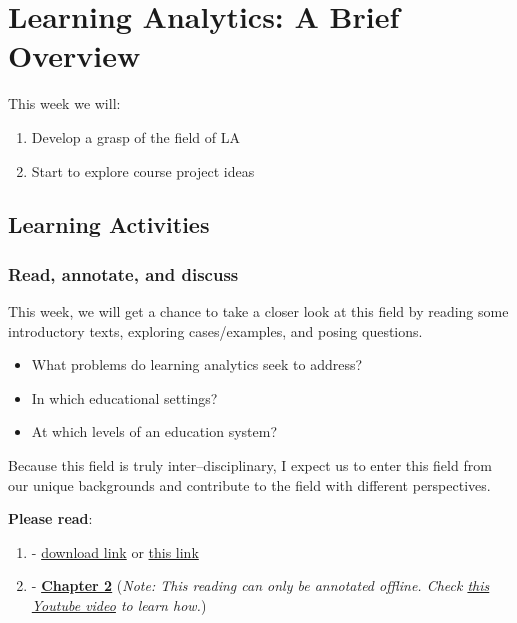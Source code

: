 \documentclass[
]{book}
\providecommand{\tightlist}{%
  \setlength{\itemsep}{0pt}\setlength{\parskip}{0pt}}
\begin{document}
\hypertarget{learning-analytics-a-brief-overview}{%
\chapter{Learning Analytics: A Brief Overview}\label{learning-analytics-a-brief-overview}}

This week we will:

\begin{enumerate}
\def\labelenumi{\arabic{enumi}.}
\tightlist
\item
  Develop a grasp of the field of LA
\item
  Start to explore course project ideas
\end{enumerate}

\hypertarget{learning-activities}{%
\section{Learning Activities}\label{learning-activities}}

\hypertarget{read-annotate-and-discuss}{%
\subsection{Read, annotate, and discuss}\label{read-annotate-and-discuss}}

This week, we will get a chance to take a closer look at this field by reading some introductory texts, exploring cases/examples, and posing questions.

\begin{itemize}
\tightlist
\item
  What problems do learning analytics seek to address?
\item
  In which educational settings?
\item
  At which levels of an education system?
\end{itemize}

Because this field is truly inter--disciplinary, I expect us to enter this field from our unique backgrounds and contribute to the field with different perspectives.

\textbf{Please read}:

\begin{enumerate}
\def\labelenumi{\arabic{enumi}.}
\tightlist
\item
  \citet{siemens2013learning} - \href{https://journals-sagepub-com.ezp2.lib.umn.edu/doi/pdf/10.1177/0002764213498851}{download link} or \href{http://journals.sagepub.com/doi/pdf/10.1177/0002764213498851}{this link}
\item
  \citet{krumm2018learning} - \textbf{\href{https://drive.google.com/open?id=1LB5J1UytIV2yOq47xKFrnneTJ7YCMJQV}{Chapter 2}} (\emph{Note: This reading can only be annotated offline. Check \href{https://www.youtube.com/watch?v=YZW6L-0qkwI}{this Youtube video} to learn how.})
\end{enumerate}
\end{document}
